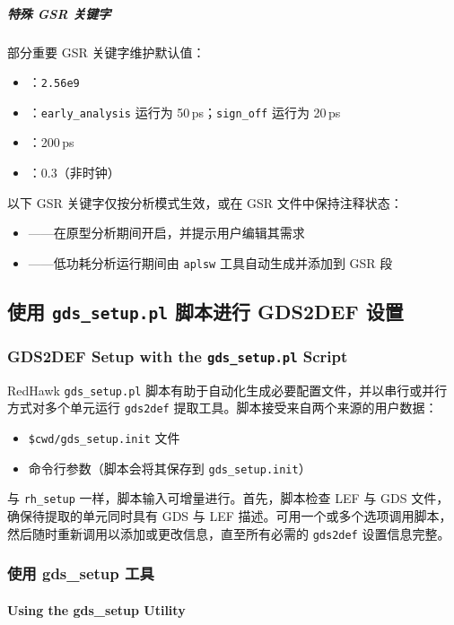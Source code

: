 \subparagraph{特殊 GSR 关键字}
部分重要 GSR 关键字维护默认值：
\begin{itemize}
  \item {}：\texttt{2.56e9}
  \item {}：\texttt{early\_analysis} 运行为 50\,ps；\texttt{sign\_off} 运行为 20\,ps
  \item {}：200\,ps
  \item {}：0.3（非时钟）
\end{itemize}

以下 GSR 关键字仅按分析模式生效，或在 GSR 文件中保持注释状态：
\begin{itemize}
  \item {}——在原型分析期间开启，并提示用户编辑其需求
  \item {}——低功耗分析运行期间由 \texttt{aplsw} 工具自动生成并添加到 GSR 段
\end{itemize}

\subsection{使用 \texttt{gds\_setup.pl} 脚本进行 GDS2DEF 设置}
\subsubsection*{GDS2DEF Setup with the \texttt{gds\_setup.pl} Script}

RedHawk \texttt{gds\_setup.pl} 脚本有助于自动化生成必要配置文件，并以串行或并行方式对多个单元运行 \texttt{gds2def} 提取工具。脚本接受来自两个来源的用户数据：
\begin{itemize}
  \item \texttt{\$cwd/gds\_setup.init} 文件
  \item 命令行参数（脚本会将其保存到 \texttt{gds\_setup.init}）
\end{itemize}

与 \texttt{rh\_setup} 一样，脚本输入可增量进行。首先，脚本检查 LEF 与 GDS 文件，确保待提取的单元同时具有 GDS 与 LEF 描述。可用一个或多个选项调用脚本，然后随时重新调用以添加或更改信息，直至所有必需的 \texttt{gds2def} 设置信息完整。

\subsubsection{使用 gds\_setup 工具}
\paragraph*{Using the gds\_setup Utility}

